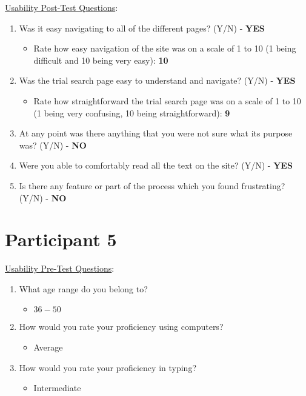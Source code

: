 \documentclass[12pt]{article}
\begin{document}
\noindent \underline{Usability Post-Test Questions}:
\begin{enumerate}
    \item Was it easy navigating to all of the different pages? (Y/N) - \textbf{YES}
      \begin{itemize}
        \item Rate how easy navigation of the site was on a scale of 1 to 10 (1 being difficult and 10 being very easy): \textbf{10}
      \end{itemize}
      \item Was the trial search page easy to understand and navigate? (Y/N) - \textbf{YES}
      \begin{itemize}
        \item Rate how straightforward the trial search page was on a scale of 1 to 10 (1 being very confusing, 10 being straightforward): \textbf{9}
      \end{itemize}
    \item At any point was there anything that you were not sure what its purpose was? (Y/N) - \textbf{NO}
    \item Were you able to comfortably read all the text on the site? (Y/N) - \textbf{YES}
    \item  Is there any feature or part of the process which you found frustrating? (Y/N) - \textbf{NO}
  \end{enumerate}

\section{Participant 5}
\underline{Usability Pre-Test Questions}:
\begin{enumerate}
  \item What age range do you belong to?
    \begin{itemize}
      \item $36 - 50$
    \end{itemize}
	\item How would you rate your proficiency using computers?
    \begin{itemize}
      \item Average
    \end{itemize}
  \item How would you rate your proficiency in typing?
    \begin{itemize}
      \item Intermediate
    \end{itemize}
\end{enumerate}
\end{document}
